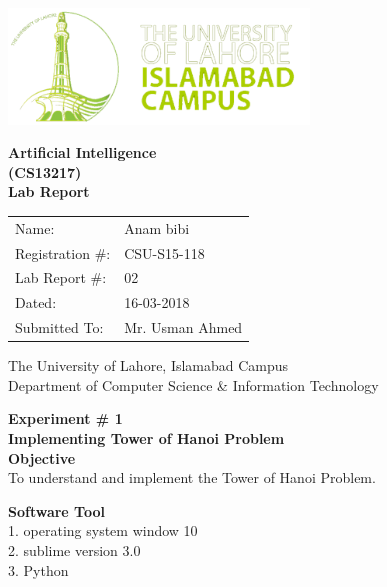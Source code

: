 \documentclass[11pt]{article}            %
\begin{document}
\begin{titlepage}
    \centering
  \vfill
    \includegraphics[width=8cm]{uni_logo.png} \\ 
	\vskip2cm
    {\bfseries\Large
	Artificial Intelligence \\ (CS13217)\\
	
	\vskip2cm
	Lab Report 
	 
	\vskip2cm
	}    

\begin{center}
\begin{tabular}{ l l  } 

Name: & Anam bibi \\ 
Registration \#: & CSU-S15-118 \\ 
Lab Report \#: & 02 \\ 
 Dated:& 16-03-2018\\ 
Submitted To:& Mr. Usman Ahmed\\ 

\end{tabular}
\end{center}
    \vfill
    The University of Lahore, Islamabad Campus\\
Department of Computer Science \& Information Technology
\end{titlepage}


    
    {\bfseries\Large
\centering
	Experiment \# 1 \\

Implementing Tower of Hanoi Problem\\
	
	}    
 \vskip1cm
 \textbf {Objective}\\  To understand and implement the Tower of Hanoi Problem.
 
 \textbf {Software Tool} \\
1. operating system window 10\\
2. sublime version 3.0\\
3. Python\\
\end{document}
